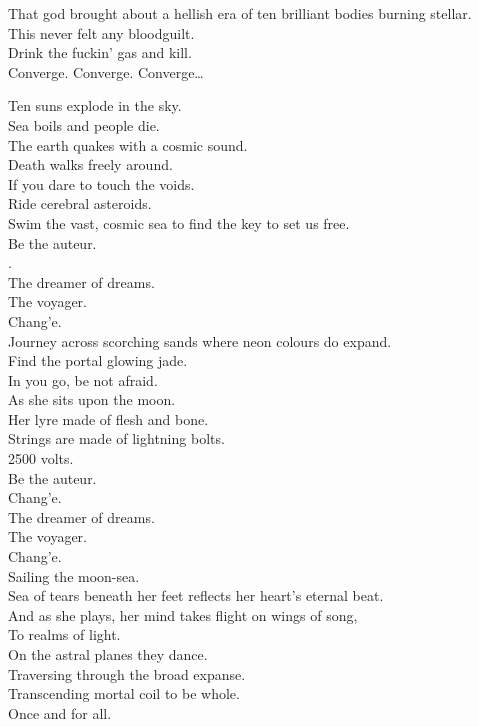 That god brought about a hellish era of ten brilliant bodies burning stellar. \\
This  never felt any bloodguilt. \\
Drink the fuckin' gas and kill. \\

Converge. Converge. Converge… \\



Ten suns explode in the sky. \\
Sea boils and people die. \\
The earth quakes with a cosmic sound. \\
Death walks freely around. \\
If you dare to touch the voids. \\
Ride cerebral asteroids. \\
Swim the vast, cosmic sea to find the key to set us free. \\

Be the auteur. \\
. \\
The dreamer of dreams. \\
The voyager. \\
Chang'e. \\

Journey across scorching sands where neon colours do expand. \\
Find the portal glowing jade. \\
In you go, be not afraid. \\
As she sits upon the moon. \\
Her lyre made of flesh and bone. \\
Strings are made of lightning bolts. \\
2500 volts. \\

Be the auteur. \\
Chang'e. \\
The dreamer of dreams. \\
The voyager. \\
Chang'e. \\
Sailing the moon-sea. \\

Sea of tears beneath her feet reflects her heart's eternal beat. \\
And as she plays, her mind takes flight on wings of song, \\
To realms of light. \\
On the astral planes they dance. \\
Traversing through the broad expanse. \\
Transcending mortal coil to be whole. \\
Once and for all. \\

